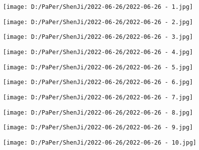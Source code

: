 \documentclass{article}
\begin{document}
\begin{figure}[h!]
	\centering
	\texttt{[image: D:/PaPer/ShenJi/2022-06-26/2022-06-26 - 1.jpg]}
\end{figure}

\begin{figure}[h!]
	\centering
	\texttt{[image: D:/PaPer/ShenJi/2022-06-26/2022-06-26 - 2.jpg]}
\end{figure}

\begin{figure}[h!]
	\centering
	\texttt{[image: D:/PaPer/ShenJi/2022-06-26/2022-06-26 - 3.jpg]}
\end{figure}

\begin{figure}[h!]
	\centering
	\texttt{[image: D:/PaPer/ShenJi/2022-06-26/2022-06-26 - 4.jpg]}
\end{figure}

\begin{figure}[h!]
	\centering
	\texttt{[image: D:/PaPer/ShenJi/2022-06-26/2022-06-26 - 5.jpg]}
\end{figure}

\begin{figure}[h!]
	\centering
	\texttt{[image: D:/PaPer/ShenJi/2022-06-26/2022-06-26 - 6.jpg]}
\end{figure}

\begin{figure}[h!]
	\centering
	\texttt{[image: D:/PaPer/ShenJi/2022-06-26/2022-06-26 - 7.jpg]}
\end{figure}

\begin{figure}[h!]
	\centering
	\texttt{[image: D:/PaPer/ShenJi/2022-06-26/2022-06-26 - 8.jpg]}
\end{figure}

\begin{figure}[h!]
	\centering
	\texttt{[image: D:/PaPer/ShenJi/2022-06-26/2022-06-26 - 9.jpg]}
\end{figure}

\begin{figure}[h!]
	\centering
	\texttt{[image: D:/PaPer/ShenJi/2022-06-26/2022-06-26 - 10.jpg]}
\end{figure}
\end{document}
